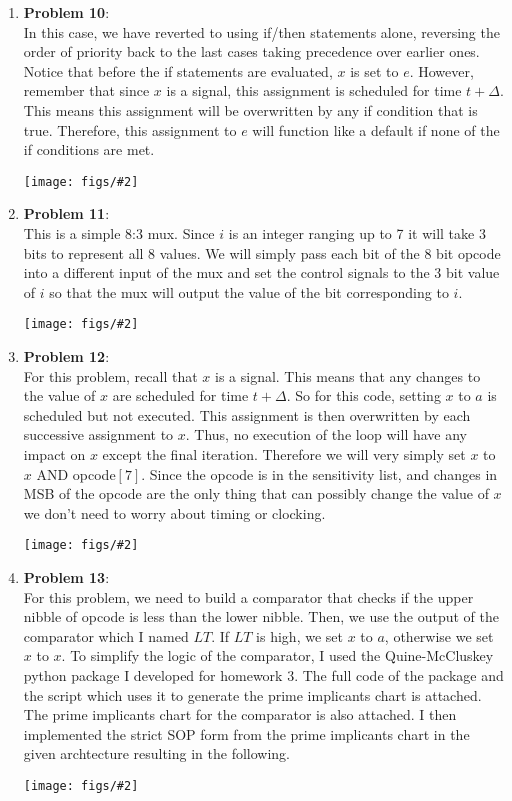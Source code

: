 \documentclass{article}
\newcommand{\fig}[2]{
    \begin{center}
        \texttt{[image: figs/\#2]}
    \end{center}
}
\begin{document}
\begin{enumerate}
        \item \textbf{Problem 10}: \\
            In this case, we have reverted to using if/then statements alone,
            reversing the order of priority back to the last cases taking
            precedence over earlier ones. Notice that before the if statements
            are evaluated, $x$ is set to $e$. However, remember that since $x$
            is a signal, this assignment is scheduled for time $t + \Delta$.
            This means this assignment will be overwritten by any if condition
            that is true. Therefore, this assignment to $e$ will function like
            a default if none of the if conditions are met.
            \fig{.5}{p10.jpg}
        \pagebreak

        \item \textbf{Problem 11}: \\
            This is a simple 8:3 mux. Since $i$ is an integer ranging up to 7 it
            will take 3 bits to represent all 8 values. We will simply pass each
            bit of the 8 bit opcode into a different input of the mux and set
            the control signals to the 3 bit value of $i$ so that the mux will
            output the value of the bit corresponding to $i$.
            \fig{.5}{p11.jpg}

        \item \textbf{Problem 12}: \\
            For this problem, recall that $x$ is a signal. This means that any
            changes to the value of $x$ are scheduled for time $t + \Delta$. So
            for this code, setting $x$ to $a$ is scheduled but not executed.
            This assignment is then overwritten by each successive assignment to
            $x$. Thus, no execution of the loop will have any impact on $x$
            except the final iteration. Therefore we will very simply set $x$ to
            $x$ AND opcode$[7]$. Since the opcode is in the sensitivity list,
            and changes in MSB of the opcode are the only thing that can
            possibly change the value of $x$ we don't need to worry about
            timing or clocking.
            \fig{.3}{p12.jpg}
        \pagebreak

        \item \textbf{Problem 13}: \\
            For this problem, we need to build a comparator that checks if the
            upper nibble of opcode is less than the lower nibble. Then, we use
            the output of the comparator which I named $LT$. If $LT$ is high, we
            set $x$ to $a$, otherwise we set $x$ to $x$. To simplify the logic
            of the comparator, I used the Quine-McCluskey python package I
            developed for homework 3. The full code of the package and the
            script which uses it to generate the prime implicants chart is
            attached. The prime implicants chart for the comparator is also
            attached. I then implemented the strict SOP form from the prime
            implicants chart in the given archtecture resulting in the
            following.
            \fig{.75}{p13.jpg}


\end{enumerate}
\end{document}
